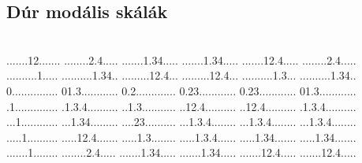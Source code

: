  
 
\pagestyle{empty}

\vspace*{\fill}
\subsection*{Dúr modális skálák}~\\
          {.......12.......%
           ........2.4.....%
           .......1.34.....%
           .......1.34.....%
           .......12.4.....%
           ........2.4.....}
          {..........1.....%
           ..........1.34..%
           .........12.4...%
           .........12.4...%
           ..........1.3...%
           ..........1.34..}
          {0...............%
           01.3............%
           0.2.............%
           0.23............%
           0.23............%
           01.3............}         
          {.1..............%
           .1.3.4..........%
           ..1.3...........%
           ..12.4..........%
           ..12.4..........%
           .1.3.4..........} 
          {...1............%
           ...1.34.........%
           ....23..........%
           ...1.3.4........%
           ...1.3.4........%
           ...1.3.4........} 
          {.....1..........%
           .....12.4.......%
           .....1.3........%
           .....1.3.4......%
           .....1.34.......%
           .....1.34.......} 
          {.......1........%
           ........2.4.....%
           .......1.34.....%
           .......1.34.....%
           .......12.4.....%
           .......12.4.....} 
\vspace*{\fill}

